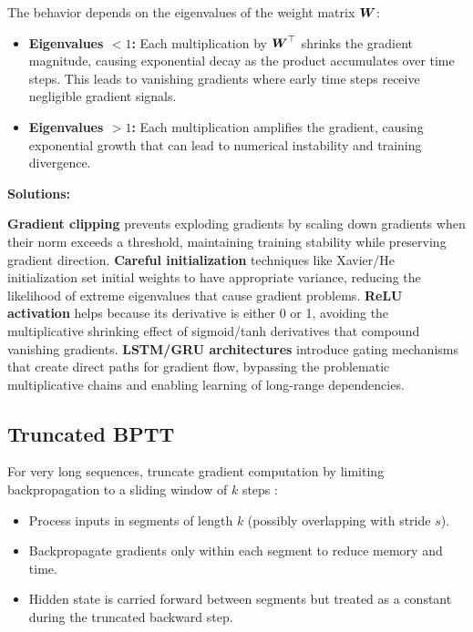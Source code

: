 The behavior depends on the eigenvalues of the weight matrix $\boldsymbol{W}$:
\begin{itemize}
    \item \textbf{Eigenvalues $< 1$:} Each multiplication by $\boldsymbol{W}^\top$ shrinks the gradient magnitude, causing exponential decay as the product accumulates over time steps. This leads to vanishing gradients where early time steps receive negligible gradient signals.
    \item \textbf{Eigenvalues $> 1$:} Each multiplication amplifies the gradient, causing exponential growth that can lead to numerical instability and training divergence.
\end{itemize}

\textbf{Solutions:}

\textbf{Gradient clipping} prevents exploding gradients by scaling down gradients when their norm exceeds a threshold, maintaining training stability while preserving gradient direction. \textbf{Careful initialization} techniques like Xavier/He initialization set initial weights to have appropriate variance, reducing the likelihood of extreme eigenvalues that cause gradient problems. \textbf{ReLU activation} helps because its derivative is either 0 or 1, avoiding the multiplicative shrinking effect of sigmoid/tanh derivatives that compound vanishing gradients. \textbf{LSTM/GRU architectures} introduce gating mechanisms that create direct paths for gradient flow, bypassing the problematic multiplicative chains and enabling learning of long-range dependencies.

\subsection{Truncated BPTT}

For very long sequences, truncate gradient computation by limiting backpropagation to a sliding window of $k$ steps \cite{GoodfellowEtAl2016}:
\begin{itemize}
    \item Process inputs in segments of length $k$ (possibly overlapping with stride $s$).
    \item Backpropagate gradients only within each segment to reduce memory and time.
    \item Hidden state is carried forward between segments but treated as a constant during the truncated backward step.
\end{itemize}

